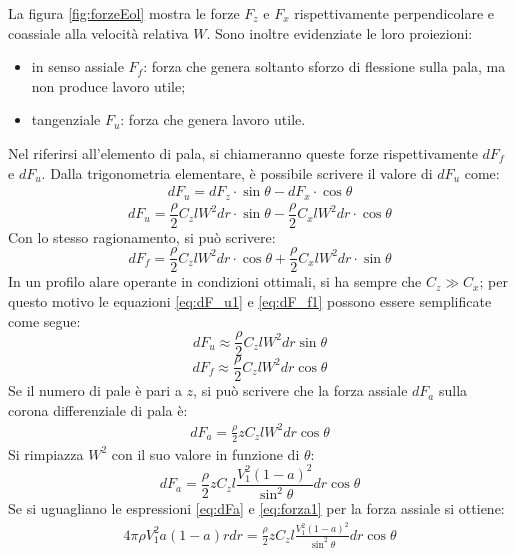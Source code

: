 La figura \ref{fig:forzeEol} mostra le forze $F_z$ e $F_x$ rispettivamente perpendicolare e coassiale alla velocità relativa $W$. Sono inoltre evidenziate le loro proiezioni:
\begin{itemize}
	\item in senso assiale $F_f$: forza che genera soltanto sforzo di flessione sulla pala, ma non produce lavoro utile;
	\item tangenziale $F_u$: forza che genera lavoro utile.
\end{itemize}
Nel riferirsi all'elemento di pala, si chiameranno queste forze rispettivamente $dF_f$ e $dF_u$. Dalla trigonometria elementare, è possibile scrivere il valore di $dF_u$ come:
\begin{align*}
dF_u = dF_z \cdot \sin \theta - dF_x \cdot \cos \theta
\end{align*}
\begin{equation}\label{eq:dF_u1}
dF_u = \frac{\rho}{2} C_z l W^2 dr \cdot \sin \theta - \frac{\rho}{2} C_x l W^2 dr \cdot \cos \theta
\end{equation}
Con lo stesso ragionamento, si può scrivere:
\begin{equation}\label{eq:dF_f1}
dF_f = \frac{\rho}{2} C_z l W^2 dr \cdot \cos \theta + \frac{\rho}{2} C_x l W^2 dr \cdot \sin \theta
\end{equation}
In un profilo alare operante in condizioni ottimali, si ha sempre che $C_z \gg C_x$; per questo motivo le equazioni \ref{eq:dF_u1} e \ref{eq:dF_f1} possono essere semplificate come segue:
\begin{equation}\label{eq:dF_u2}
dF_u \approx \frac{\rho}{2} C_zl W^2 dr \sin \theta
\end{equation}
\begin{equation}\label{eq:dF_f2}
dF_f \approx \frac{\rho}{2} C_zl W^2 dr \cos \theta
\end{equation}
Se il numero di pale è pari a $z$, si può scrivere che la forza assiale $dF_a$ sulla corona differenziale di pala è:
\begin{align*}
dF_a = \frac{\rho}{2} z C_z l W^2 dr \cos \theta
\end{align*}
Si rimpiazza $W^2$ con il suo valore in funzione di $\theta$:
\begin{equation}\label{eq:dFa}
dF_a = \frac{\rho}{2} z C_z l \frac{V_1^2 \left( 1- a \right)^2}{\sin^2 \theta} dr \cos \theta
\end{equation}
Se si uguagliano le espressioni \ref{eq:dFa} e \ref{eq:forza1} per la forza assiale si ottiene:
\begin{align*}
4 \pi \rho V_1^2 a \left( 1-a \right) r dr = \frac{\rho}{2} z C_z l \frac{V_1^2 \left( 1- a \right)^2 }{\sin^2 \theta} dr \cos \theta
\end{align*}
